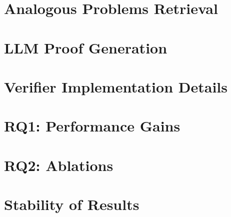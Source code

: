\documentclass[11pt]{article}
\begin{document}


\appendix
\label{appendix}




\section{Analogous Problems Retrieval}

\label{appendix:analogous_problems_retrieval}

\section{LLM Proof Generation}

\label{appendix:LLM_proof_generation}


\section{Verifier Implementation Details}

\label{appendix:verifier_details}


\section{RQ1: Performance Gains }

\label{appendix:results_rq1}


\section{RQ2: Ablations}

\label{appendix:results_rq2}


\section{Stability of Results}

\label{appendix:stability_of_results}






% 
\end{document}
